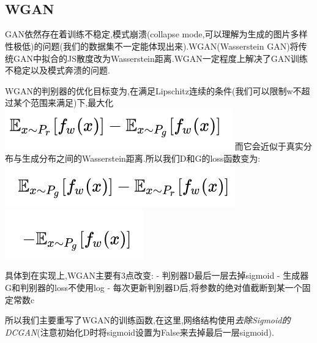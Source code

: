 \documentclass[11pt]{article}
\makeatletter
\def\maxwidth{\ifdim\Gin@nat@width>\linewidth\linewidth
    \else\Gin@nat@width\fi}
\let\Oldincludegraphics\includegraphics
\renewcommand{\includegraphics}[1]{\Oldincludegraphics[width=.8\maxwidth]{#1}}
\makeatother
\begin{document}
    \begin{center}
    \end{center}
    { \hspace*{\fill} \\}
    
    \begin{center}
    \end{center}
    { \hspace*{\fill} \\}
    
    \hypertarget{wgan}{%
\subsection{WGAN}\label{wgan}}

    GAN依然存在着训练不稳定,模式崩溃(collapse
mode,可以理解为生成的图片多样性极低)的问题(我们的数据集不一定能体现出来).WGAN(Wasserstein
GAN)将传统GAN中拟合的JS散度改为Wasserstein距离.WGAN一定程度上解决了GAN训练不稳定以及模式奔溃的问题.

WGAN的判别器的优化目标变为,在满足Lipschitz连续的条件(我们可以限制w不超过某个范围来满足)下,最大化
\includegraphics{pictures/wgan1.png}
而它会近似于真实分布与生成分布之间的Wasserstein距离.所以我们D和G的loss函数变为:
\includegraphics{pictures/wgan3.png}
\includegraphics{pictures/wgan2.png}

具体到在实现上,WGAN主要有3点改变: - 判别器D最后一层去掉sigmoid -
生成器G和判别器的loss不使用log -
每次更新判别器D后,将参数的绝对值截断到某一个固定常数c

所以我们主要重写了WGAN的训练函数,在这里,网络结构使用\emph{去除Sigmoid的DCGAN}(注意初始化D时将sigmoid设置为False来去掉最后一层sigmoid).
\end{document}
